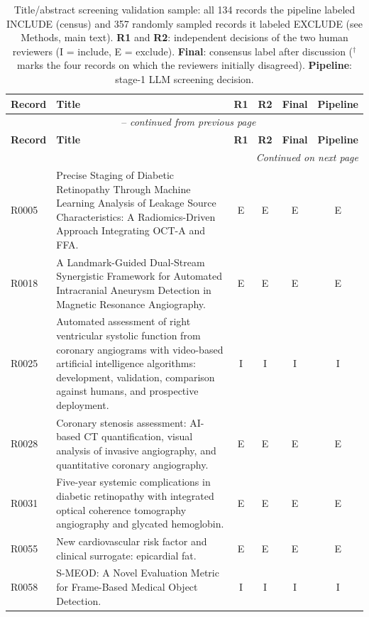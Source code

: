 \renewcommand{\arraystretch}{1.05}
\footnotesize
\begin{longtable}{@{}l p{8.6cm} c c c c@{}}
\caption{Title/abstract screening validation sample: all 134 records the pipeline labeled INCLUDE (census) and 357 randomly sampled records it labeled EXCLUDE (see Methods, main text). \textbf{R1} and \textbf{R2}: independent decisions of the two human reviewers (I = include, E = exclude). \textbf{Final}: consensus label after discussion ($^{\dagger}$ marks the four records on which the reviewers initially disagreed). \textbf{Pipeline}: stage-1 LLM screening decision.}
\label{tab:screening_validation_full} \\
\toprule
\textbf{Record} & \textbf{Title} & \textbf{R1} & \textbf{R2} & \textbf{Final} & \textbf{Pipeline} \\
\midrule
\endfirsthead
\multicolumn{6}{c}{\tablename~\thetable{} -- \textit{continued from previous page}} \\
\toprule
\textbf{Record} & \textbf{Title} & \textbf{R1} & \textbf{R2} & \textbf{Final} & \textbf{Pipeline} \\
\midrule
\endhead
\midrule
\multicolumn{6}{r}{\textit{Continued on next page}} \\
\endfoot
\bottomrule
\endlastfoot
R0005 & Precise Staging of Diabetic Retinopathy Through Machine Learning Analysis of Leakage Source Characteristics: A Radiomics-Driven Approach Integrating OCT-A and FFA. & E & E & E & E \\
R0018 & A Landmark-Guided Dual-Stream Synergistic Framework for Automated Intracranial Aneurysm Detection in Magnetic Resonance Angiography. & E & E & E & E \\
R0025 & Automated assessment of right ventricular systolic function from coronary angiograms with video-based artificial intelligence algorithms: development, validation, comparison against humans, and prospective deployment. & I & I & I & I \\
R0028 & Coronary stenosis assessment: AI-based CT quantification, visual analysis of invasive angiography, and quantitative coronary angiography. & E & E & E & E \\
R0031 & Five-year systemic complications in diabetic retinopathy with integrated optical coherence tomography angiography and glycated hemoglobin. & E & E & E & E \\
R0055 & New cardiovascular risk factor and clinical surrogate: epicardial fat. & E & E & E & E \\
R0058 & S-MEOD: A Novel Evaluation Metric for Frame-Based Medical Object Detection. & I & I & I & I \\

\end{longtable}
